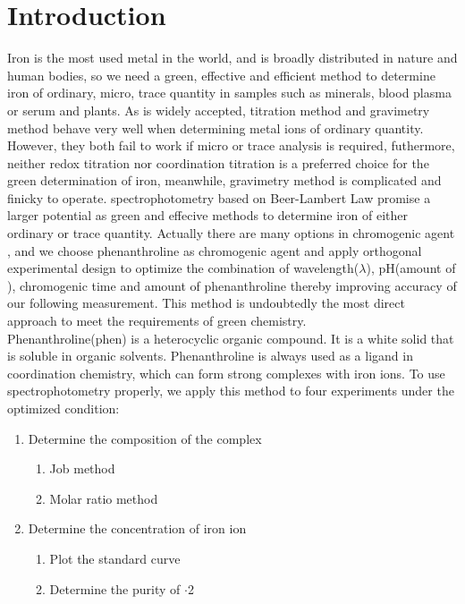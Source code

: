 \documentclass[journal=jacsat,manuscript=article]{achemso}
\begin{document}
\section{Introduction}
Iron is the most used metal in the world, and is broadly distributed in nature and human bodies, so we need a green, effective and efficient method to determine iron of ordinary, micro, trace quantity in samples such as minerals, blood plasma or serum\cite{Ramsay1957The,Wong1923COLORIMETRIC} and plants\cite{Reis1994Multicommutation, Suo-YiHuang2004DeterminationofIron}. As is widely accepted, titration method and gravimetry method behave very well when determining metal ions of ordinary quantity. However, they both fail to work if micro or trace analysis is required, futhermore, neither redox titration nor coordination titration is a preferred choice for the green determination of iron, meanwhile, gravimetry method is complicated and finicky to operate. spectrophotometry based on Beer-Lambert Law promise a larger potential as green and effecive methods to determine iron of either ordinary or trace quantity\cite{King1991Spectrophotometric,Carter1971Spectrophotometric,T1975Nitrosophenol}. Actually there are many options in chromogenic agent \cite{Yoe1944Colorimetric,Stookey1970Ferrozine,Er-KunShang20134}, and we choose phenanthroline as chromogenic agent and apply orthogonal experimental design to optimize the combination of wavelength($\lambda$), pH(amount of ), chromogenic time and amount of phenanthroline thereby improving accuracy of our following measurement. This method is undoubtedly the most direct approach to meet the requirements of green chemistry.\\
Phenanthroline(phen) is a heterocyclic organic compound. It is a white solid that is soluble in organic solvents. Phenanthroline is always used as a ligand in coordination chemistry, which can form strong complexes with iron ions. To use spectrophotometry properly, we apply this method to four experiments under the optimized condition:
\begin{enumerate}
    \item Determine the composition of the complex
    \begin{enumerate}
        \item Job method
        \item Molar ratio method
    \end{enumerate}
    \item Determine the concentration of iron ion
    \begin{enumerate}
        \item Plot the standard curve
        \item Determine the purity of $\cdot$2
    \end{enumerate}
\end{enumerate}
\end{document}
